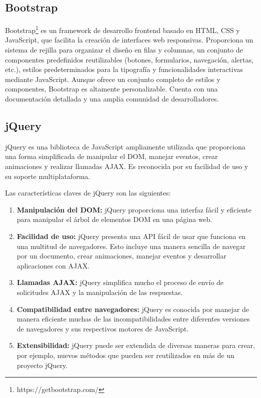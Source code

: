 \documentclass[a4paper, 12pt]{book}
\begin{document}
\subsection{Bootstrap}
\label{subsec:bootstrap} Bootstrap\footnote{https://getbootstrap.com/} es un framework de desarrollo frontend basado en HTML, CSS y JavaScript, que facilita la creación de interfaces web responsivas. 
Proporciona un sistema de rejilla para organizar el diseño en filas y columnas, un conjunto de componentes predefinidos reutilizables (botones, formularios, navegación, 
alertas, etc.), estilos predeterminados para la tipografía y funcionalidades interactivas mediante JavaScript. Aunque ofrece un conjunto completo de estilos y 
componentes, Bootstrap es altamente personalizable. Cuenta con una documentación detallada y una amplia comunidad de desarrolladores.

\subsection{jQuery}
\label{subsec:jquery}
jQuery es una biblioteca de JavaScript ampliamente utilizada que proporciona una forma simplificada de manipular el DOM, manejar eventos, crear animaciones y realizar llamadas AJAX. Es reconocida por su facilidad de uso y su soporte multiplataforma. 

Las características claves de jQuery son las siguientes:

\begin{enumerate}
  \item \textbf{Manipulación del DOM:} jQuery proporciona una interfaz fácil y eficiente para manipular el árbol de elementos DOM en una página web.
  \item \textbf{Facilidad de uso:} jQuery presenta una API fácil de usar que funciona en una multitud de navegadores. Esto incluye una manera sencilla de navegar por un documento, crear animaciones, manejar eventos y desarrollar aplicaciones con AJAX.
  \item \textbf{Llamadas AJAX:} jQuery simplifica mucho el proceso de envío de solicitudes AJAX y la manipulación de las respuestas.
  \item \textbf{Compatibilidad entre navegadores:} jQuery es conocida por manejar de manera eficiente muchas de las incompatibilidades entre diferentes versiones de navegadores y sus respectivos motores de JavaScript.
  \item \textbf{Extensibilidad:} jQuery puede ser extendida de diversas maneras para crear, por ejemplo, nuevos métodos que pueden ser reutilizados en más de un proyecto jQuery.
\end{enumerate}
\end{document}
